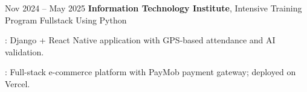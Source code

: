 \begin{twocolentry}{
    Nov 2024 – May 2025
}
\textbf{Information Technology Institute}, Intensive Training Program\newline
Fullstack Using Python\end{twocolentry}

\vspace{0.10 cm}
\begin{onecolentry}
    \begin{highlights}
        \item {}: Django + React Native application with GPS-based attendance and AI validation.
        \item {}: Full-stack e-commerce platform with PayMob payment gateway; deployed on Vercel.
    \end{highlights}
\end{onecolentry}